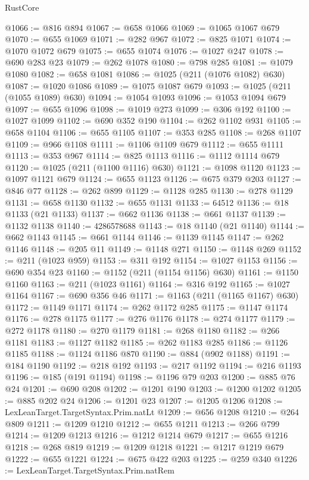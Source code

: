 \begin{lexlean}{RustCore}
\begin{coremodule}
@1066 := @816 @894
@1067 := @658 @1066
@1069 := @1065 @1067 @679
@1070 := @655 @1069
@1071 := @282 @967
@1072 := @825 @1071
@1074 := @1070 @1072 @679
@1075 := @655 @1074
@1076 := @1027 @247
@1078 := @690 @283 @23
@1079 := @262 @1078
@1080 := @798 @285
@1081 := @1079 @1080
@1082 := @658 @1081
@1086 := @1025 (@211 (@1076 @1082) @630)
@1087 := @1020 @1086
@1089 := @1075 @1087 @679
@1093 := @1025 (@211 (@1055 @1089) @630)
@1094 := @1054 @1093
@1096 := @1053 @1094 @679
@1097 := @655 @1096
@1098 := @1019 @273
@1099 := @306 @192
@1100 := @1027 @1099
@1102 := @690 @352 @190
@1104 := @262 @1102 @931
@1105 := @658 @1104
@1106 := @655 @1105
@1107 := @353 @285
@1108 := @268 @1107
@1109 := @966 @1108
@1111 := @1106 @1109 @679
@1112 := @655 @1111
@1113 := @353 @967
@1114 := @825 @1113
@1116 := @1112 @1114 @679
@1120 := @1025 (@211 (@1100 @1116) @630)
@1121 := @1098 @1120
@1123 := @1097 @1121 @679
@1124 := @655 @1123
@1126 := @675 @379 @203
@1127 := @846 @77
@1128 := @262 @899
@1129 := @1128 @285
@1130 := @278 @1129
@1131 := @658 @1130
@1132 := @655 @1131
@1133 := 64512
@1136 := @18 @1133 (@21 @1133)
@1137 := @662 @1136
@1138 := @661 @1137
@1139 := @1132 @1138
@1140 := 4286578688
@1143 := @18 @1140 (@21 @1140)
@1144 := @662 @1143
@1145 := @661 @1144
@1146 := @1139 @1145
@1147 := @262 @1146
@1148 := @205 @11
@1149 := @1148 @271
@1150 := @1148 @269
@1152 := @211 (@1023 @959)
@1153 := @311 @192
@1154 := @1027 @1153
@1156 := @690 @354 @23
@1160 := @1152 (@211 (@1154 @1156) @630)
@1161 := @1150 @1160
@1163 := @211 (@1023 @1161)
@1164 := @316 @192
@1165 := @1027 @1164
@1167 := @690 @356 @46
@1171 := @1163 (@211 (@1165 @1167) @630)
@1172 := @1149 @1171
@1174 := @262 @1172 @285
@1175 := @1147 @1174
@1176 := @278 @1175
@1177 := @276 @1176
@1178 := @274 @1177
@1179 := @272 @1178
@1180 := @270 @1179
@1181 := @268 @1180
@1182 := @266 @1181
@1183 := @1127 @1182
@1185 := @262 @1183 @285
@1186 := @1126 @1185
@1188 := @1124 @1186 @870
@1190 := @884 (@902 @1188)
@1191 := @184 @1190
@1192 := @218 @192
@1193 := @217 @1192
@1194 := @216 @1193
@1196 := @185 (@191 @1194)
@1198 := @1196 @79 @203
@1200 := @885 @76 @24
@1201 := @690 @208
@1202 := @1201 @190
@1203 := @1200 @1202
@1205 := @885 @202 @24
@1206 := @1201 @23
@1207 := @1205 @1206
@1208 := LexLeanTarget.TargetSyntax.Prim.natLt
@1209 := @656 @1208
@1210 := @264 @809
@1211 := @1209 @1210
@1212 := @655 @1211
@1213 := @266 @799
@1214 := @1209 @1213
@1216 := @1212 @1214 @679
@1217 := @655 @1216
@1218 := @268 @819
@1219 := @1209 @1218
@1221 := @1217 @1219 @679
@1222 := @655 @1221
@1224 := @675 @422 @203
@1225 := @259 @340
@1226 := LexLeanTarget.TargetSyntax.Prim.natRem

\end{coremodule}
\end{lexlean}
